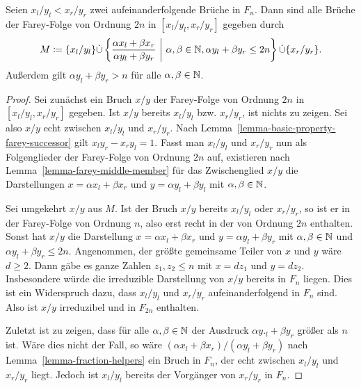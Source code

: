 \begin{lemma}\label{lemma-candidates-next-farey-bound}
	Seien $x_l/y_l < x_r/y_r$ zwei aufeinanderfolgende Brüche in $F_n$.
	Dann sind alle Brüche der Farey-Folge von Ordnung $2n$ in $[x_l/y_l, x_r/y_r]$ gegeben durch
	\[
		M\coloneq \{ x_l/y_l \} \dot\cup \left\{ \frac{\alpha x_l + \beta x_r}{\alpha y_l + \beta y_r} ~\middle\vert~ \alpha,\beta\in\mathbb{N}, \alpha y_l + \beta y_r\leq 2n \right\} \dot\cup \{ x_r/y_r \}.
	\]
	Außerdem gilt $\alpha y_l + \beta y_r > n$ für alle $\alpha,\beta \in\mathbb{N}$.
\end{lemma}
\begin{proof}
	Sei zunächst ein Bruch $x/y$ der Farey-Folge von Ordnung $2n$ in $[x_l / y_l, x_r/y_r]$ gegeben.
	Ist $x/y$ bereits $x_l/y_l$ bzw. $x_r/y_r$, ist nichts zu zeigen.
	Sei also $x/y$ echt zwischen $x_l/y_l$ und $x_r/y_r$.
	Nach Lemma~\ref{lemma-basic-property-farey-successor} gilt $x_ly_r - x_ry_l = 1$.
	Fasst man $x_l/y_l$ und $x_r/y_r$ nun als Folgenglieder der Farey-Folge von Ordnung $2n$ auf, existieren nach Lemma~\ref{lemma-farey-middle-member} für das Zwischenglied $x/y$ die Darstellungen $x = \alpha x_l + \beta x_r$ und $y= \alpha y_l + \beta y_l$ mit $\alpha, \beta \in\mathbb{N}$.
	
	Sei umgekehrt $x/y$ aus $M$.
	Ist der Bruch $x/y$ bereits $x_l/y_l$ oder $x_r/y_r$, so ist er in der Farey-Folge von Ordnung $n$, also erst recht in der von Ordnung $2n$ enthalten.
	Sonst hat $x/y$ die Darstellung $x=\alpha x_l + \beta x_r$ und $y=\alpha y_l + \beta y_r$ mit $\alpha,\beta\in\mathbb{N}$ und $\alpha y_l + \beta y_r \leq 2n$.
	Angenommen, der größte gemeinsame Teiler von $x$ und $y$ wäre $d\geq 2$.
	Dann gäbe es ganze Zahlen $z_1, z_2 \leq n$ mit $x=d z_1$ und $y=d z_2$.
	Insbesondere würde die irreduzible Darstellung von $x/y$ bereits in $F_n$ liegen.
	Dies ist ein Widerspruch dazu, dass $x_l/y_l$ und $x_r/y_r$ aufeinanderfolgend in $F_n$ sind.
	Also ist $x/y$ irreduzibel und in $F_{2n}$ enthalten.
	
	Zuletzt ist zu zeigen, dass für alle $\alpha,\beta\in\mathbb{N}$ der Ausdruck $\alpha y._l + \beta y_r$ größer als $n$ ist.
	Wäre dies nicht der Fall, so wäre $(\alpha x_l + \beta x_r) / (\alpha y_l + \beta y_r)$ nach Lemma~\ref{lemma-fraction-helpers} ein Bruch in $F_n$, der echt zwischen $x_l/y_l$ und $x_r/y_r$ liegt.
	Jedoch ist $x_l/y_l$ bereits der Vorgänger von $x_r/y_r$ in $F_n$.
\end{proof}

